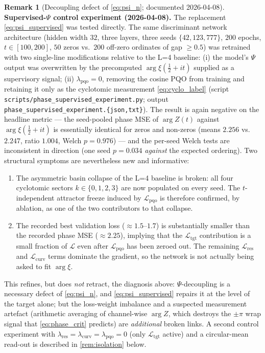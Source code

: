 \documentclass[11pt, a4paper]{article}
\theoremstyle{definition}
\newtheorem{remark}{Remark}[section]
\theoremstyle{plain}
\newcommand{\xif}{\xi}                      %
\newcommand{\Psip}{\Psi}                    %
\begin{document}
\begin{remark}[Decoupling defect of \cref{eq:psi_n};
documented 2026-04-08]
\smallskip\noindent\textbf{Supervised-$\Psip$ control experiment
(2026-04-08).} The replacement \cref{eq:psi_supervised} was tested
directly. The same discriminant network architecture (hidden width
$32$, three layers, three seeds $\{42,123,777\}$, $200$ epochs,
$t \in [100, 200]$, $50$ zeros vs.\ $200$ off-zero ordinates of gap
$\geq 0.5$) was retrained with two single-line modifications relative
to the L=4 baseline: (i) the model's $\Psip$ output was overwritten by
the precomputed $\arg\xif(\tfrac{1}{2}+it)$ supplied as a supervisory
signal; (ii) $\lambda_{\mathrm{pqo}}=0$, removing the cosine PQO from
training and retaining it only as the cyclotomic measurement
\cref{eq:cyclo_label} (script
\texttt{scripts/phase\_supervised\_experiment.py}; output
\texttt{phase\_supervised\_experiment.\{json,txt\}}). The result is
again negative on the headline metric — the seed-pooled phase MSE of
$\arg Z(t)$ against $\arg \xif(\tfrac{1}{2}+it)$ is essentially
identical for zeros and non-zeros (means $2.256$ vs.\ $2.247$, ratio
$1.004$, Welch $p = 0.976$) — and the per-seed Welch tests are
inconsistent in direction (one seed $p=0.034$ \emph{against} the
expected ordering). Two structural symptoms are nevertheless new and
informative:
\begin{enumerate}
  \item The asymmetric basin collapse of the L=4 baseline is broken:
        all four cyclotomic sectors $k\in\{0,1,2,3\}$ are now populated
        on every seed. The $t$-independent attractor freeze induced by
        $\mathcal{L}_{\mathrm{pqo}}$ is therefore confirmed, by ablation,
        as one of the two contributors to that collapse.
  \item The recorded best validation loss ($\approx 1.5$--$1.7$) is
        substantially smaller than the recorded phase MSE
        ($\approx 2.25$), implying that the $\mathcal{L}_{\mathrm{tgt}}$
        contribution is a small fraction of $\mathcal{L}$ even after
        $\mathcal{L}_{\mathrm{pqo}}$ has been zeroed out. The remaining
        $\mathcal{L}_{\mathrm{res}}$ and $\mathcal{L}_{\mathrm{curv}}$
        terms dominate the gradient, so the network is not actually
        being asked to fit $\arg \xif$.
\end{enumerate}
This refines, but does \emph{not} retract, the diagnosis above:
$\Psip$-decoupling is a necessary defect of \cref{eq:psi_n}, and
\cref{eq:psi_supervised} repairs it at the level of the target alone;
but the loss-weight imbalance and a suspected measurement artefact
(arithmetic averaging of channel-wise $\arg Z$, which destroys the
$\pm\pi$ wrap signal that \cref{eq:phase_crit} predicts) are
\emph{additional} broken links. A second control experiment with
$\lambda_{\mathrm{res}}=\lambda_{\mathrm{curv}}=\lambda_{\mathrm{pqo}}=0$
(only $\mathcal{L}_{\mathrm{tgt}}$ active) and a circular-mean
read-out is described in \cref{rem:isolation} below.
\end{remark}
\end{document}
